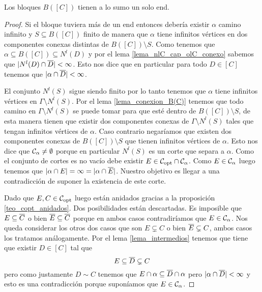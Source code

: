 \documentclass[tesis.tex]{subfiles}
\begin{document}
\begin{lema}\label{lema_bloques_1_end}
	Los bloques $B([C])$ tienen a lo sumo un solo end.
\end{lema}
\begin{proof}
	Si el bloque tuviera más de un end entonces debería existir $\alpha$ camino infinito y $S \subseteq B([C])$ finito de manera que $\alpha$ tiene infinitos vértices en dos componentes conexas distintas de $B([C]) \setminus S$.
	Como tenemos que $\alpha \subseteq B([C]) \subseteq N^l(D)$ y por el lema \ref{lema_nlC_cap_olC_conexo} sabemos que $|N^l(D) \cap \overline D | < \infty$.
	Esto nos dice que en particular para todo $D \in [C]$ tenemos que $|\alpha \cap \overline D| < \infty$.
	
	El conjunto $N^l(S)$ sigue siendo finito por lo tanto tenemos que $\alpha$ tiene infinitos vértices en $\Gamma \setminus N^l(S)$.
	Por el lema \ref{lema_conexion_B(C)} tenemos que todo camino en $\Gamma \setminus N^l(S)$ se puede tomar para que esté dentro de $B([C]) \setminus S$, de esta manera tienen que existir dos componentes conexas de $\Gamma \setminus N^l(S)$ tales que tengan infinitos vértices de $\alpha$. 
	Caso contrario negaríamos que existen dos componentes conexas de $B([C]) \setminus S$ que tienen infinitos vértices de $\alpha$.
	Esto nos dice que ${\cal C}_{\alpha} \neq \emptyset$ porque en particular $N^l(S)$ es un corte que separa a $\alpha$.
	Como el conjunto de cortes es no vacío debe existir $E \in {\cal C}_{\text{opt}} \cap {\cal C}_{\alpha}$.
	Como $E \in {\cal C}_{\alpha}$ luego tenemos que $|\alpha \cap E| = \infty = |\alpha \cap \overline E|$.
	Nuestro objetivo es llegar a una contradicción de suponer la existencia de este corte. 	
	
	Dado que $E,C \in {\cal C}_{\text{opt}}$ luego están anidados gracias a la proposición \ref{teo_copt_anidados}.
	Dos posibilidades están descartadas. 
	Es imposible que $E \subseteq \overline C$ o bien $\overline E \subseteq \overline C$ porque en ambos casos contradiríamos que $E \in {\cal C}_{\alpha}$.
	Nos queda considerar los otros dos casos que son $E \subsetneq C$ o bien $\overline E \subsetneq C$, ambos casos los tratamos análogamente.
	Por el lema \ref{lema_intermedios} tenemos que tiene que existir $D \in [C]$ tal que 
	\[
		E \subseteq \overline D \subsetneq C
	\]
	pero como justamente $D \sim C$ tenemos que $E \cap \alpha \subseteq \overline D \cap \alpha$ pero $|\alpha \cap \overline D| < \infty$ y esto es una contradicción porque suponíamos que $E \in {\cal C}_{\alpha}$.
\end{proof}
\end{document}
